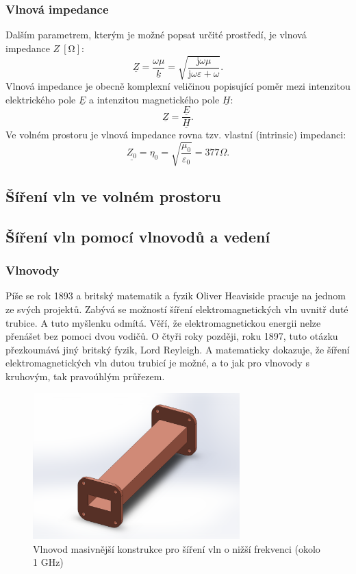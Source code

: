\documentclass[12pt,a4paper,oneside]{article}
\numberwithin{equation}{section} %
\numberwithin{figure}{section} %
\numberwithin{table}{section} %
\newcommand{\mj}{\mathrm{j}} %
\newcommand{\faz}[1]{{\underline{#1}}} %
\begin{document}
\subsubsection*{Vlnová impedance}
Dalším parametrem, kterým je možné popsat určité prostředí, je vlnová impedance $Z ~\mathrm{[\Omega]}$:
\begin{equation}
\faz{Z} = \frac{\omega \mu}{\faz{k}} = \sqrt{\dfrac{\mj \omega \mu}{\mj \omega \varepsilon + \omega}} .
\end{equation}
Vlnová impedance je obecně komplexní veličinou popisující poměr mezi intenzitou elektrického pole $\faz{E}$ a intenzitou magnetického pole $\faz{H}$:
\begin{equation}
\faz{Z} = \frac{\faz{E}}{\faz{H}} .
\end{equation}
Ve volném prostoru je vlnová impedance rovna tzv. vlastní (intrinsic) impedanci:
\begin{equation}
\faz{Z_0} = \eta _0 = \sqrt{\dfrac{\mu _0}{\varepsilon _0}} = 377 \Omega .
\end{equation}


\subsection{Šíření vln ve volném prostoru}


\newpage
\subsection{Šíření vln pomocí vlnovodů a vedení}
\subsubsection{Vlnovody}
Píše se rok 1893 a britský matematik a fyzik Oliver Heaviside pracuje na jednom ze svých projektů. Zabývá se možností šíření elektromagnetických vln uvnitř duté trubice. A tuto myšlenku odmítá. Věří, že elektromagnetickou energii nelze přenášet bez pomoci dvou vodičů. O čtyři roky později, roku 1897, tuto otázku přezkoumává jiný britský fyzik, Lord Reyleigh. A matematicky dokazuje, že šíření elektromagnetických vln dutou trubicí je možné, a to jak pro vlnovody s kruhovým, tak pravoúhlým průřezem.

\begin{figure}[h] 
\begin{center}
\includegraphics[width=8cm]{vlnovod.pdf}
\caption{Vlnovod masivnější konstrukce pro šíření vln o nižší frekvenci (okolo 1 GHz)}
\label{vlnovod}
\end{center}
\end{figure}
\end{document}
